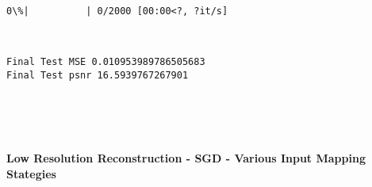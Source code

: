 \documentclass[11pt]{article}
\begin{document}
    
    \begin{Verbatim}[commandchars=\\\{\}]
  0\%|          | 0/2000 [00:00<?, ?it/s]
    \end{Verbatim}

    
    \begin{center}
    \end{center}
    { \hspace*{\fill} \\}
    
    \begin{Verbatim}[commandchars=\\\{\}]
Final Test MSE 0.010953989786505683
Final Test psnr 16.5939767267901
    \end{Verbatim}

    \begin{center}
    \end{center}
    { \hspace*{\fill} \\}
    
    \begin{center}
    \end{center}
    { \hspace*{\fill} \\}
    
    \hypertarget{low-resolution-reconstruction---sgd---various-input-mapping-stategies}{%
\paragraph{Low Resolution Reconstruction - SGD - Various Input Mapping
Stategies}\label{low-resolution-reconstruction---sgd---various-input-mapping-stategies}}
\end{document}
